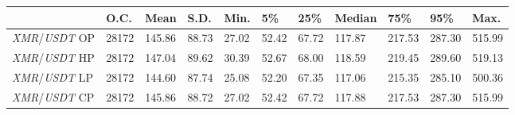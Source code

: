 \begin{tabular}{lllllllllll}
\toprule
 & \textbf{O.C.} & \textbf{Mean} & \textbf{S.D.} & \textbf{Min.} & \textbf{5\%} & \textbf{25\%} & \textbf{Median} & \textbf{75\%} & \textbf{95\%} & \textbf{Max.} \\
\midrule
\emph{XMR}/\emph{USDT} OP & 28172 & 145.86 & 88.73 & 27.02 & 52.42 & 67.72 & 117.87 & 217.53 & 287.30 & 515.99 \\
\emph{XMR}/\emph{USDT} HP & 28172 & 147.04 & 89.62 & 30.39 & 52.67 & 68.00 & 118.59 & 219.45 & 289.60 & 519.13 \\
\emph{XMR}/\emph{USDT} LP & 28172 & 144.60 & 87.74 & 25.08 & 52.20 & 67.35 & 117.06 & 215.35 & 285.10 & 500.36 \\
\emph{XMR}/\emph{USDT} CP & 28172 & 145.86 & 88.72 & 27.02 & 52.42 & 67.72 & 117.88 & 217.53 & 287.30 & 515.99 \\
\bottomrule
\end{tabular}
